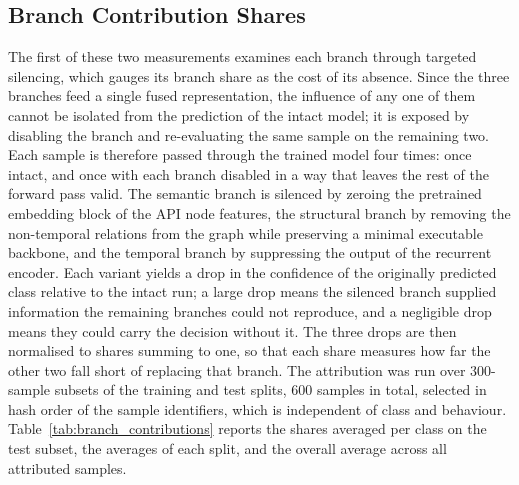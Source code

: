 \documentclass[%
    BCOR=10mm,
    DIV=13,
    toc=bibliography,
    toc=listof,
    oneside,
    12pt,
]{scrbook}
\begin{document}
\subsection{Branch Contribution Shares}
\label{subsec:branch_contributions}

The first of these two measurements examines each branch through targeted
silencing, which gauges its branch share as the cost of its
absence. Since the three branches feed a single fused representation, the
influence of any one of them cannot be isolated from the prediction of the
intact model; it is exposed by disabling the branch and re-evaluating the same
sample on the remaining two. Each sample is therefore passed through the
trained model four times: once intact, and once with each branch disabled in a
way that leaves the rest of the forward pass valid. The
semantic branch is silenced by zeroing the pretrained embedding block of the
API node features, the structural branch by removing the non-temporal relations
from the graph while preserving a minimal executable backbone, and the temporal
branch by suppressing the output of the recurrent encoder. Each variant yields
a drop in the confidence of the originally predicted class relative to the
intact run; a large drop means the silenced branch supplied information the
remaining branches could not reproduce, and a negligible drop means they could
carry the decision without it. The three drops are then normalised to shares summing to
one, so that each share measures how far the other two fall short of replacing
that branch. The attribution was run over $300$-sample subsets of
the training and test splits, $600$ samples in total, selected in hash order of
the sample identifiers, which is independent of class and behaviour.
Table~\ref{tab:branch_contributions} reports the shares averaged per class on
the test subset, the averages of each split, and the overall average across all
attributed samples.
\end{document}
